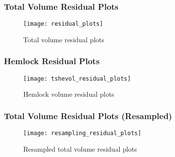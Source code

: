 \documentclass{beamer}
\begin{document}
\begin{frame}
	\frametitle{Total Volume Residual Plots}
	\begin{figure}[h]
		\centering
		\texttt{[image: residual\_plots]}
		\caption{\label{fig:total_resids}Total volume residual plots}
	\end{figure}
\end{frame}

\begin{frame}
	\frametitle{Hemlock Residual Plots}
	\begin{figure}[h]
		\centering
	\texttt{[image: tshevol\_residual\_plots]}
	\caption{\label{fig:hemlock_resids}Hemlock volume residual plots}
	\end{figure}
\end{frame}


\begin{frame}
	\frametitle{Total Volume Residual Plots (Resampled)}
	\begin{figure}[h]
		\centering
	\texttt{[image: resampling\_residual\_plots]}
	\caption{\label{fig:resamp_resids}Resampled total volume residual plots}
	\end{figure}
\end{frame}
\end{document}

